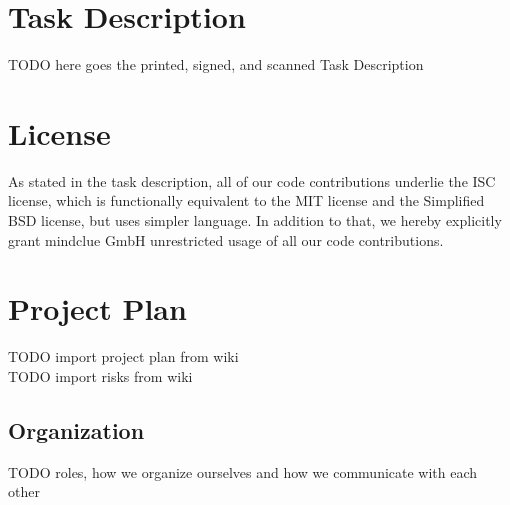 \documentclass[a4paper]{report}
\begin{document}
\chapter{Task Description}\label{ch:task-desc}
TODO here goes the printed, signed, and scanned Task Description

\chapter{License}
As stated in the task description, all of our code contributions underlie the
ISC license, which is functionally equivalent to the MIT license and the
Simplified BSD license, but uses simpler language. In addition to that, we
hereby explicitly grant mindclue GmbH unrestricted usage of all our code
contributions.


\chapter{Project Plan}
TODO import project plan from wiki\\
TODO import risks from wiki\\

\section{Organization}
TODO roles, how we organize ourselves and how we communicate with each other



\end{document}
